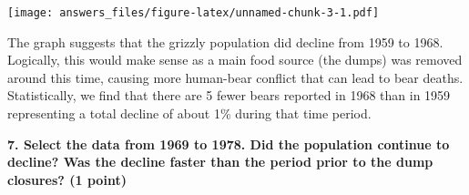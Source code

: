 \documentclass[]{article}
\newenvironment{Shaded}{\begin{snugshade}}{\end{snugshade}}
\newcommand{\KeywordTok}[1]{\textcolor[rgb]{0.13,0.29,0.53}{\textbf{#1}}}
\newcommand{\DecValTok}[1]{\textcolor[rgb]{0.00,0.00,0.81}{#1}}
\newcommand{\StringTok}[1]{\textcolor[rgb]{0.31,0.60,0.02}{#1}}
\newcommand{\CommentTok}[1]{\textcolor[rgb]{0.56,0.35,0.01}{\textit{#1}}}
\newcommand{\OperatorTok}[1]{\textcolor[rgb]{0.81,0.36,0.00}{\textbf{#1}}}
\newcommand{\NormalTok}[1]{#1}
\begin{document}
\texttt{[image: answers\_files/figure-latex/unnamed-chunk-3-1.pdf]}

\begin{Shaded}
\end{Shaded}

The graph suggests that the grizzly population did decline from 1959 to
1968. Logically, this would make sense as a main food source (the dumps)
was removed around this time, causing more human-bear conflict that can
lead to bear deaths. Statistically, we find that there are 5 fewer bears
reported in 1968 than in 1959 representing a total decline of about 1\%
during that time period.

\textbf{7. Select the data from 1969 to 1978. Did the population
continue to decline? Was the decline faster than the period prior to the
dump closures? (1 point)}
\end{document}
